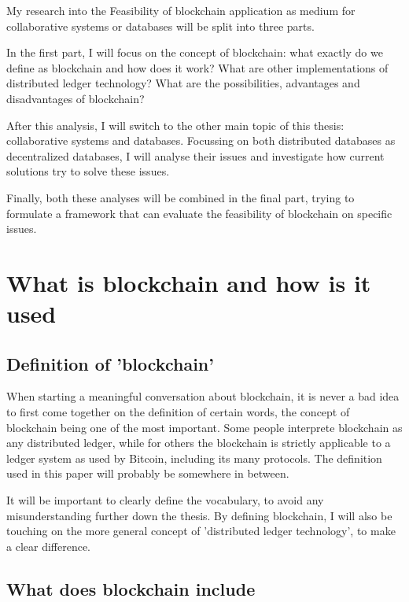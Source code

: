 \documentclass[11pt,a4paper]{article}
\begin{document}
\tableofcontents
\pagebreak



My research into the Feasibility of blockchain application as medium for collaborative systems or databases will be split into three parts.

In the first part, I will focus on the concept of blockchain: what exactly do we define as blockchain and how does it work? What are other implementations of distributed ledger technology? What are the possibilities, advantages and disadvantages of blockchain?

After this analysis, I will switch to the other main topic of this thesis: collaborative systems and databases. Focussing on both distributed databases as decentralized databases, I will analyse their issues and investigate how current solutions try to solve these issues.

Finally, both these analyses will be combined in the final part, trying to formulate a framework that can evaluate the feasibility of blockchain on specific issues.

\section{What is blockchain and how is it used}

\subsection{Definition of 'blockchain'}

When starting a meaningful conversation about blockchain, it is never a bad idea to first come together on the definition of certain words, the concept of blockchain being one of the most important. Some people interprete blockchain as any distributed ledger, while for others the blockchain is strictly applicable to a ledger system as used by Bitcoin, including its many protocols. The definition used in this paper will probably be somewhere in between.

It will be important to clearly define the vocabulary, to avoid any misunderstanding further down the thesis. By defining blockchain, I will also be touching on the more general concept of 'distributed ledger technology', to make a clear difference.

\subsection{What does blockchain include}
\end{document}
